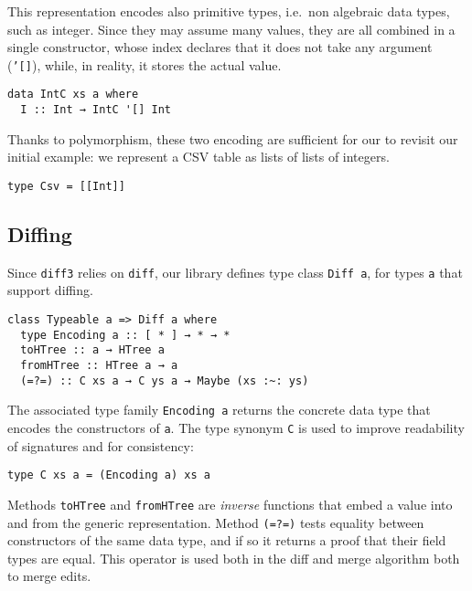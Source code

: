 \documentclass{sigplanconf}
\theoremstyle{plain}
\begin{document}
%
This representation encodes also primitive types, i.e.\ non algebraic
data types, such as integer.
%
Since they may assume many values, they are all combined in a single
constructor, whose index declares that it does not take any argument
(\texttt{'[]}), while, in reality, it stores the actual value.
\begin{verbatim}
data IntC xs a where
  I :: Int → IntC '[] Int
\end{verbatim}
Thanks to polymorphism, these two encoding are sufficient for our to
revisit our initial example: we represent a CSV table as lists of
lists of integers.
\begin{verbatim}
type Csv = [[Int]]
\end{verbatim} 

\subsection{Diffing}
Since \texttt{diff3} relies on \texttt{diff}, our library defines type
class \texttt{Diff a}, for types \texttt{a} that support diffing.

\begin{verbatim}
class Typeable a => Diff a where
  type Encoding a :: [ * ] → * → *
  toHTree :: a → HTree a
  fromHTree :: HTree a → a
  (=?=) :: C xs a → C ys a → Maybe (xs :~: ys)
\end{verbatim}
The associated type family \texttt{Encoding a} returns the concrete
data type that encodes the constructors of \texttt{a}.
%
The type synonym \texttt{C} is used to improve readability of signatures
and for consistency:
\begin{verbatim}
type C xs a = (Encoding a) xs a
\end{verbatim}
%
Methods \texttt{toHTree} and \texttt{fromHTree} are \emph{inverse}
functions that embed a value into and from the generic representation.
% 
%
%
%
%
Method \texttt{(=?=)} tests equality between constructors of the same
data type, and if so it returns a proof that their field types are
equal. This operator is used both in the diff and merge algorithm both
to merge edits.
%
\end{document}
